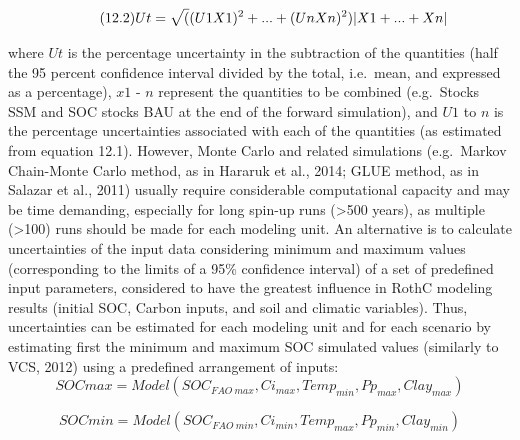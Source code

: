 \documentclass[
  10pt,
  b5paper,
]{book}
\begin{document}
\begin{equation}
\tag{12.2}
Ut = \sqrt((U1X1)^2 + ... + (UnXn)^2) \\
|X1+ ... +Xn|
\end{equation}

where \(Ut\) is the percentage uncertainty in the subtraction of the quantities (half the 95 percent confidence interval divided by the total, i.e.~mean, and expressed as a percentage), \(x1\) - \(n\) represent the quantities to be combined (e.g.~Stocks SSM and SOC stocks BAU at the end of the forward simulation), and \(U1\) to \(n\) is the percentage uncertainties associated with each of the quantities (as estimated from equation 12.1).
However, Monte Carlo and related simulations (e.g.~Markov Chain-Monte Carlo method, as in Hararuk et al., 2014; GLUE method, as in Salazar et al., 2011) usually require considerable computational capacity and may be time demanding, especially for long spin-up runs (\textgreater500 years), as multiple (\textgreater100) runs should be made for each modeling unit.
An alternative is to calculate uncertainties of the input data considering minimum and maximum values (corresponding to the limits of a 95\% confidence interval) of a set of predefined input parameters, considered to have the greatest influence in RothC modeling results (initial SOC, Carbon inputs, and soil and climatic variables). Thus, uncertainties can be estimated for each modeling unit and for each scenario by estimating first the minimum and maximum SOC simulated values (similarly to VCS, 2012) using a predefined arrangement of inputs:
\begin{equation}
\tag{12.3}
SOC max = Model(SOC_{FAO \ max}, Ci_{max}, Temp_{min}, Pp_{max}, Clay_{max})       
\end{equation}

\begin{equation}
\tag{12.4}
  SOC min = Model(SOC_{FAO \ min}, Ci_{min}, Temp_{max}, Pp_{min}, Clay_{min})          
\end{equation}
\end{document}

